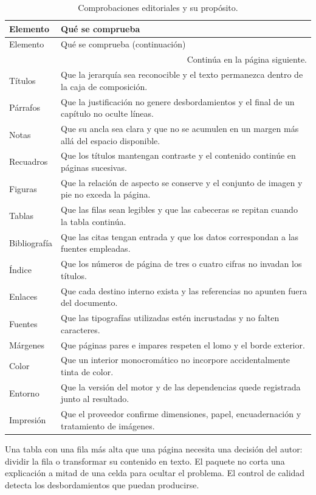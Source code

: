 \small
\begin{longtable}{@{}p{.28\linewidth}p{.65\linewidth}@{}}
\caption{Comprobaciones editoriales y su propósito.}\label{tab:control}\\
\toprule Elemento & Qué se comprueba\\\midrule\endfirsthead
\toprule Elemento & Qué se comprueba (continuación)\\\midrule\endhead
\midrule\multicolumn{2}{r}{Continúa en la página siguiente.}\\\endfoot
\bottomrule\endlastfoot
Títulos & Que la jerarquía sea reconocible y el texto permanezca dentro de la caja de composición.\\
Párrafos & Que la justificación no genere desbordamientos y el final de un capítulo no oculte líneas.\\
Notas & Que su ancla sea clara y que no se acumulen en un margen más allá del espacio disponible.\\
Recuadros & Que los títulos mantengan contraste y el contenido continúe en páginas sucesivas.\\
Figuras & Que la relación de aspecto se conserve y el conjunto de imagen y pie no exceda la página.\\
Tablas & Que las filas sean legibles y que las cabeceras se repitan cuando la tabla continúa.\\
Bibliografía & Que las citas tengan entrada y que los datos correspondan a las fuentes empleadas.\\
Índice & Que los números de página de tres o cuatro cifras no invadan los títulos.\\
Enlaces & Que cada destino interno exista y las referencias no apunten fuera del documento.\\
Fuentes & Que las tipografías utilizadas estén incrustadas y no falten caracteres.\\
Márgenes & Que páginas pares e impares respeten el lomo y el borde exterior.\\
Color & Que un interior monocromático no incorpore accidentalmente tinta de color.\\
Entorno & Que la versión del motor y de las dependencias quede registrada junto al resultado.\\
Impresión & Que el proveedor confirme dimensiones, papel, encuadernación y tratamiento de imágenes.\\
\end{longtable}
\normalsize

Una tabla con una fila más alta que una página necesita una decisión del autor: dividir la fila o transformar su contenido en texto. El paquete no corta una explicación a mitad de una celda para ocultar el problema. El control de calidad detecta los desbordamientos que puedan producirse.

